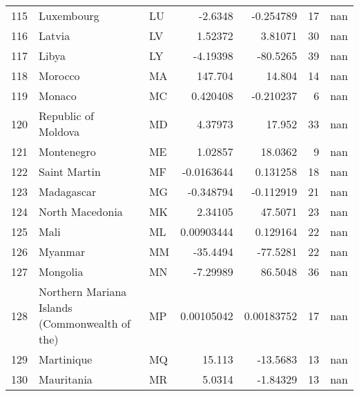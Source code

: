 \begin{tabular}{rllrrrr}
 115 & Luxembourg                                     & LU         &   -2.6348      &   -0.254789   &     17 &          nan \\
 116 & Latvia                                         & LV         &    1.52372     &    3.81071    &     30 &          nan \\
 117 & Libya                                          & LY         &   -4.19398     &  -80.5265     &     39 &          nan \\
 118 & Morocco                                        & MA         &  147.704       &   14.804      &     14 &          nan \\
 119 & Monaco                                         & MC         &    0.420408    &   -0.210237   &      6 &          nan \\
 120 & Republic of Moldova                            & MD         &    4.37973     &   17.952      &     33 &          nan \\
 121 & Montenegro                                     & ME         &    1.02857     &   18.0362     &      9 &          nan \\
 122 & Saint Martin                                   & MF         &   -0.0163644   &    0.131258   &     18 &          nan \\
 123 & Madagascar                                     & MG         &   -0.348794    &   -0.112919   &     21 &          nan \\
 124 & North Macedonia                                & MK         &    2.34105     &   47.5071     &     23 &          nan \\
 125 & Mali                                           & ML         &    0.00903444  &    0.129164   &     22 &          nan \\
 126 & Myanmar                                        & MM         &  -35.4494      &  -77.5281     &     22 &          nan \\
 127 & Mongolia                                       & MN         &   -7.29989     &   86.5048     &     36 &          nan \\
 128 & Northern Mariana Islands (Commonwealth of the) & MP         &    0.00105042  &    0.00183752 &     17 &          nan \\
 129 & Martinique                                     & MQ         &   15.113       &  -13.5683     &     13 &          nan \\
 130 & Mauritania                                     & MR         &    5.0314      &   -1.84329    &     13 &          nan \\

\end{tabular}
